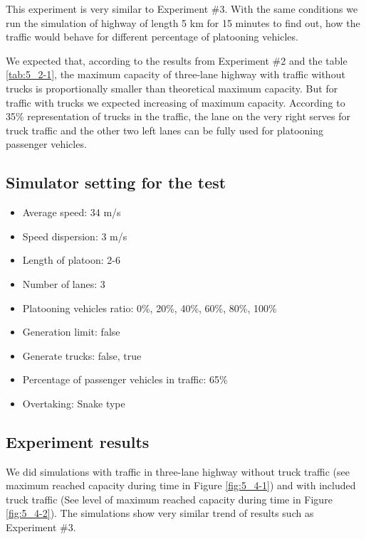This experiment is very similar to Experiment \#3. With the same conditions we run the simulation of highway of length 5 km for 15 minutes to find out, how the traffic would behave for different percentage of platooning vehicles. 

We expected that, according to the results from Experiment \#2 and the table \ref{tab:5_2-1}, the maximum capacity of three-lane highway with traffic without trucks is proportionally smaller than theoretical maximum capacity. But for traffic with trucks we expected increasing of maximum capacity. According to 35\% representation of trucks in the traffic, the lane on the very right serves for  truck traffic and the other  two left lanes can be fully used for platooning passenger vehicles.



\subsection*{Simulator setting for the test}
\begin{itemize}
\item Average speed: 34 m/s
\item Speed dispersion: 3 m/s
\item Length of platoon: 2-6
\item Number of lanes:  3
\item Platooning vehicles ratio: 0\%, 20\%, 40\%, 60\%, 80\%, 100\%
\item Generation limit: false
\item Generate trucks: false, true
\item Percentage of passenger vehicles in traffic: 65\%
\item Overtaking: Snake type
\end{itemize}



\subsection*{Experiment results}
We did simulations with traffic in three-lane highway without truck traffic (see maximum reached capacity during time in Figure \ref{fig:5_4-1}) and with included truck traffic (See level of maximum reached capacity during time in Figure \ref{fig:5_4-2}). The simulations show very similar trend of results such as Experiment \#3.


